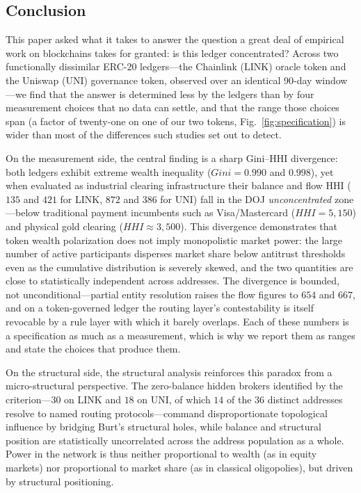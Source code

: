 \documentclass[final,5p,times]{elsarticle}
\begin{document}
\subsection{Conclusion}
This paper asked what it takes to answer the question a great deal of
empirical work on blockchains takes for granted: is this ledger
concentrated? Across two functionally dissimilar ERC-20 ledgers---the
Chainlink (LINK) oracle token and the Uniswap (UNI) governance token,
observed over an identical 90-day window---we find that the answer is
determined less by the ledgers than by four measurement choices that no data
can settle, and that the range those choices span (a factor of twenty-one on
one of our two tokens, Fig.~\ref{fig:specification}) is wider than most of
the differences such studies set out to detect.

On the measurement side, the central finding is a sharp Gini--HHI divergence: both ledgers exhibit extreme wealth inequality ($Gini = 0.990$ and $0.998$), yet when evaluated as industrial clearing infrastructure their balance and flow HHI ($135$ and $421$ for LINK, $872$ and $386$ for UNI) fall in the DOJ \textit{unconcentrated} zone---below traditional payment incumbents such as Visa/Mastercard ($HHI = 5{,}150$) and physical gold clearing ($HHI \approx 3{,}500$). This divergence demonstrates that token wealth polarization does not imply monopolistic market power: the large number of active participants disperses market share below antitrust thresholds even as the cumulative distribution is severely skewed, and the two quantities are close to statistically independent across addresses. The divergence is bounded, not unconditional---partial entity resolution raises the flow figures to $654$ and $667$, and on a token-governed ledger the routing layer's contestability is itself revocable by a rule layer with which it barely overlaps. Each of these numbers is a specification as much as a measurement, which is why we report them as ranges and state the choices that produce them.

On the structural side, the structural analysis reinforces this paradox from a micro-structural perspective. The zero-balance hidden brokers identified by the criterion---$30$ on LINK and $18$ on UNI, of which $14$ of the $36$ distinct addresses resolve to named routing protocols---command disproportionate topological influence by bridging Burt's structural holes, while balance and structural position are statistically uncorrelated across the address population as a whole. Power in the network is thus neither proportional to wealth (as in equity markets) nor proportional to market share (as in classical oligopolies), but driven by structural positioning.
\end{document}
